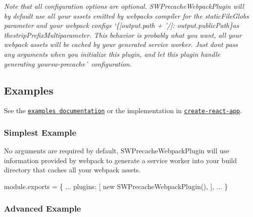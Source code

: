 \begin{DoxyItemize}
\end{DoxyItemize}

{\itshape Note that all configuration options are optional. {\ttfamily S\+W\+Precache\+Webpack\+Plugin} will by default use all your assets emitted by webpack\textquotesingle{}s compiler for the {\ttfamily static\+File\+Globs} parameter and your webpack config\textquotesingle{}s `\{\mbox{[}output.\+path + '/\textquotesingle{}\mbox{]}\+: output.\+public\+Path\}{\ttfamily as the}strip\+Prefix\+Multi{\ttfamily parameter. This behavior is probably what you want, all your webpack assets will be cached by your generated service worker. Just don\textquotesingle{}t pass any arguments when you initialize this plugin, and let this plugin handle generating your}sw-\/precache\`{} configuration.}

\subsection*{Examples}

See the \href{/examples/}{\tt examples documentation} or the implementation in \href{https://github.com/facebookincubator/create-react-app/blob/e91648a9bb55230fa15a7867fd5b730d7e1a5808/packages/react-scripts/config/webpack.config.prod.js#L308}{\tt create-\/react-\/app}.

\subsubsection*{Simplest Example}

No arguments are required by default, {\ttfamily S\+W\+Precache\+Webpack\+Plugin} will use information provided by webpack to generate a service worker into your build directory that caches all your webpack assets. 
\begin{DoxyCode}
module.exports = \{
  ...
  plugins: [
    new SWPrecacheWebpackPlugin(),
  ],
  ...
\}
\end{DoxyCode}


\subsubsection*{Advanced Example}

